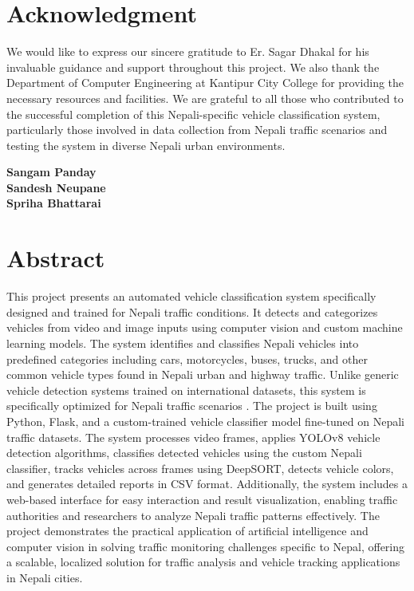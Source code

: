 \documentclass[12pt,a4paper]{report}
\begin{document}
\newpage

\chapter*{Acknowledgment}

We would like to express our sincere gratitude to Er. Sagar Dhakal for his invaluable guidance and support throughout this project. We also thank the Department of Computer Engineering at Kantipur City College for providing the necessary resources and facilities. We are grateful to all those who contributed to the successful completion of this Nepali-specific vehicle classification system, particularly those involved in data collection from Nepali traffic scenarios and testing the system in diverse Nepali urban environments.

\vspace{1cm}
\begin{flushright}
\textbf{Sangam Panday}\\
\textbf{Sandesh Neupane}\\
\textbf{Spriha Bhattarai}
\end{flushright}

\newpage

\chapter*{Abstract}

This project presents an automated vehicle classification system specifically designed and trained for Nepali traffic conditions. It detects and categorizes vehicles from video and image inputs using computer vision and custom machine learning models. The system identifies and classifies Nepali vehicles into predefined categories including cars, motorcycles, buses, trucks, and other common vehicle types found in Nepali urban and highway traffic. Unlike generic vehicle detection systems trained on international datasets, this system is specifically optimized for Nepali traffic scenarios \cite{tak2021development}. The project is built using Python, Flask, and a custom-trained vehicle classifier model fine-tuned on Nepali traffic datasets. The system processes video frames, applies YOLOv8 vehicle detection algorithms, classifies detected vehicles using the custom Nepali classifier, tracks vehicles across frames using DeepSORT, detects vehicle colors, and generates detailed reports in CSV format. Additionally, the system includes a web-based interface for easy interaction and result visualization, enabling traffic authorities and researchers to analyze Nepali traffic patterns effectively. The project demonstrates the practical application of artificial intelligence and computer vision in solving traffic monitoring challenges specific to Nepal, offering a scalable, localized solution for traffic analysis and vehicle tracking applications in Nepali cities.
\end{document}
